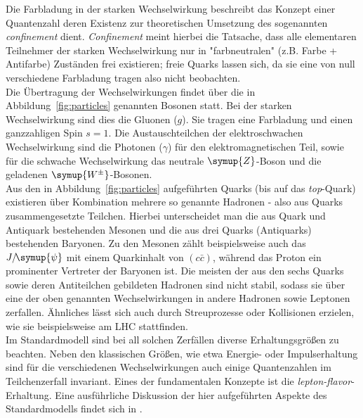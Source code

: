Die Farbladung in der starken Wechselwirkung beschreibt das Konzept einer Quantenzahl deren Existenz zur theoretischen Umsetzung des sogenannten \textit{confinement} dient. \textit{Confinement} meint hierbei die Tatsache, dass alle elementaren Teilnehmer der starken Wechselwirkung nur in "farbneutralen" (z.B. Farbe + Antifarbe) Zuständen frei existieren; freie Quarks lassen sich, da sie eine von null verschiedene Farbladung tragen also nicht beobachten.\\
%
Die Übertragung der Wechselwirkungen findet über die in Abbildung~\ref{fig:particles} genannten Bosonen statt. Bei der starken Wechselwirkung sind dies die Gluonen ($g$). Sie tragen eine Farbladung und einen ganzzahligen Spin $s=1$. Die Austauschteilchen der elektroschwachen Wechselwirkung sind die Photonen ($\gamma$) für den elektromagnetischen Teil, sowie für die schwache Wechselwirkung das neutrale $\symup{Z}$-Boson und die geladenen $\symup{W^{\pm}}$-Bosonen. \\
%
Aus den in Abbildung~\ref{fig:particles} aufgeführten Quarks (bis auf das \textit{top}-Quark) existieren über Kombination mehrere so genannte Hadronen - also aus Quarks zusammengesetzte Teilchen. Hierbei unterscheidet man die aus Quark und Antiquark bestehenden Mesonen und die aus drei Quarks (Antiquarks) bestehenden Baryonen. Zu den Mesonen zählt beispielsweise auch das $J/\!\symup{\psi}$ mit einem Quarkinhalt von $(c\bar{c})$, während das Proton ein prominenter Vertreter der Baryonen ist. Die meisten der aus den sechs Quarks sowie deren Antiteilchen gebildeten Hadronen sind nicht stabil, sodass sie über eine der oben genannten Wechselwirkungen in andere Hadronen sowie Leptonen zerfallen. Ähnliches lässt sich auch durch Streuprozesse oder Kollisionen erzielen, wie sie beispielsweise am LHC stattfinden.\\
%
Im Standardmodell sind bei all solchen Zerfällen diverse Erhaltungsgrößen zu beachten. Neben den klassischen Größen, wie etwa Energie- oder Impulserhaltung sind für die verschiedenen Wechselwirkungen auch einige Quantenzahlen im Teilchenzerfall invariant. Eines der fundamentalen Konzepte ist die \textit{lepton-flavor}-Erhaltung. Eine ausführliche Diskussion der hier aufgeführten Aspekte des Standardmodells findet sich in \cite{griffiths, HalzenMartin}.
%
